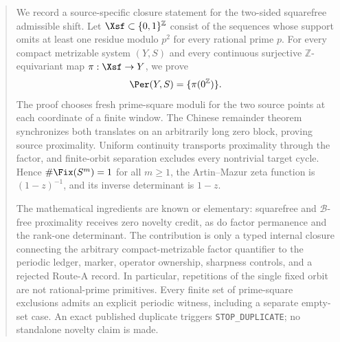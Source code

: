 \begin{abstract}
We record a source-specific closure statement for the two-sided squarefree
admissible shift.  Let \(\Xsf\subset\{0,1\}^{\mathbb Z}\) consist of the
sequences whose support omits at least one residue modulo \(p^2\) for every
rational prime \(p\).  For every compact metrizable system \((Y,S)\) and
every continuous surjective \(\mathbb Z\)-equivariant map
\(\pi:\Xsf\to Y\), we prove
\[
  \Per(Y,S)=\{\pi(0^{\mathbb Z})\}.
\]
The proof chooses fresh prime-square moduli for the two source points at each
coordinate of a finite window.  The Chinese remainder theorem synchronizes
both translates on an arbitrarily long zero block, proving source
proximality.  Uniform continuity transports proximality through the factor,
and finite-orbit separation excludes every nontrivial target cycle.  Hence
\(\#\Fix(S^m)=1\) for all \(m\geq1\), the Artin--Mazur zeta function is
\((1-z)^{-1}\), and its inverse determinant is \(1-z\).

The mathematical ingredients are known or elementary: squarefree and
\(\mathscr B\)-free proximality receives zero novelty credit, as do factor
permanence and the rank-one determinant.  The contribution is only a typed
internal closure connecting the arbitrary compact-metrizable factor
quantifier to the periodic ledger, marker, operator ownership, sharpness
controls, and a rejected Route-A record.  In particular, repetitions of the
single fixed orbit are not rational-prime primitives.  Every finite set of
prime-square exclusions admits an explicit periodic witness, including a
separate empty-set case.  An exact published duplicate triggers
\texttt{STOP\_DUPLICATE}; no standalone novelty claim is made.
\end{abstract}
